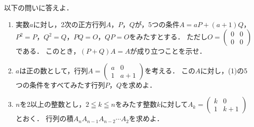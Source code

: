 \documentclass[../../main.tex]{subfiles}
\begin{document}
以下の問いに答えよ．
\begin{enumerate}
  \item 実数$a$に対し，2次の正方行列$A$，$P$，$Q$が，5つの条件$A=aP+(a+1)Q$，$P^2=P$，$Q^2=Q$，$PQ=O$，$QP=O$をみたすとする．
    ただし$O=
    \begin{pmatrix} 0 & 0 \\ 0 & 0
    \end{pmatrix}$である．
    このとき，$(P+Q)A=A$が成り立つことを示せ．
  \item $a$は正の数として，行列$A=
    \begin{pmatrix} a & 0 \\ 1 & a+1
    \end{pmatrix}$を考える．
    この$A$に対し，(1)の5つの条件をすべてみたす行列$P$，$Q$を求めよ．
  \item $n$を2以上の整数とし，$2 \leqq k \leqq n$をみたす整数$k$に対して$A_k=
    \begin{pmatrix} k & 0 \\ 1 & k+1
    \end{pmatrix}$とおく．
    行列の積$A_n A_{n-1} A_{n-2} \cdots A_2$を求めよ．
\end{enumerate}
\end{document}
